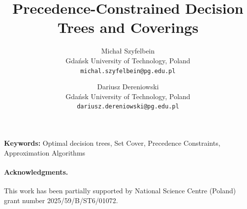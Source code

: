 \documentclass[11pt,letterpaper]{article}
\title{Precedence-Constrained Decision Trees and Coverings}
\author{%
Michał Szyfelbein\\
Gdańsk University of Technology, Poland\\
\texttt{michal.szyfelbein@pg.edu.pl}
\and
Dariusz Dereniowski\\
Gdańsk University of Technology, Poland\\
\texttt{dariusz.dereniowski@pg.edu.pl}
}
\date{}
\theoremstyle{definition}
\theoremstyle{plain}
\theoremstyle{remark}
\begin{document}
\hypersetup{pageanchor=false}
\maketitle
\thispagestyle{empty}



\noindent\textbf{Keywords:} Optimal decision trees, Set Cover, Precedence Constraints, Approximation Algorithms

\newpage
\setcounter{page}{1}
\hypersetup{pageanchor=true}









\paragraph*{Acknowledgments.}
This work has been partially supported by National Science Centre (Poland) grant number 2025/59/B/ST6/01072. 





\end{document}
